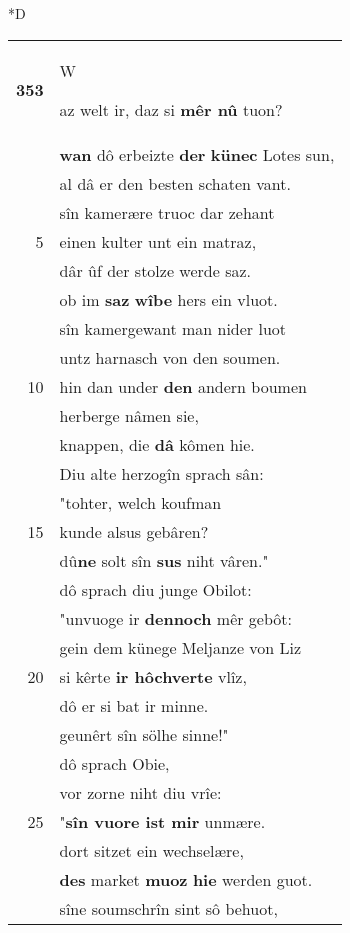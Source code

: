 \documentclass[8pt,a4paper,notitlepage]{article}
\begin{document}
\begin{table}[ht]
\begin{minipage}[t]{0.5\linewidth}
\small
\begin{center}*D
\end{center}
\begin{tabular}{rl}
\textbf{353} & \begin{large}W\end{large}az welt ir, daz si \textbf{mêr nû} tuon?\\ 
 & \textbf{wan} dô erbeizte \textbf{der} \textbf{künec} Lotes sun,\\ 
 & al dâ er den besten schaten vant.\\ 
 & sîn kamerære truoc dar zehant\\ 
5 & einen kulter unt ein matraz,\\ 
 & dâr ûf der stolze werde saz.\\ 
 & ob im \textbf{saz} \textbf{wîbe} hers ein vluot.\\ 
 & sîn kamergewant man nider luot\\ 
 & untz harnasch von den soumen.\\ 
10 & hin dan under \textbf{den} andern boumen\\ 
 & herberge nâmen sie,\\ 
 & knappen, die \textbf{dâ} kômen hie.\\ 
 & Diu alte herzogîn sprach sân:\\ 
 & "tohter, welch koufman\\ 
15 & kunde alsus gebâren?\\ 
 & dû\textbf{ne} solt sîn \textbf{sus} niht vâren."\\ 
 & dô sprach diu junge Obilot:\\ 
 & "unvuoge ir \textbf{dennoch} mêr gebôt:\\ 
 & gein dem künege Meljanze von Liz\\ 
20 & si kêrte \textbf{ir hôchverte} vlîz,\\ 
 & dô er si bat ir minne.\\ 
 & geunêrt sîn sölhe sinne!"\\ 
 & dô sprach Obie,\\ 
 & vor zorne niht diu vrîe:\\ 
25 & "\textbf{sîn vuore ist mir} unmære.\\ 
 & dort sitzet ein wechselære,\\ 
 & \textbf{des} market \textbf{muoz} \textbf{hie} werden guot.\\ 
 & sîne soumschrîn sint sô behuot,\\ 

\end{tabular}
\end{minipage}
\end{table}
\end{document}
